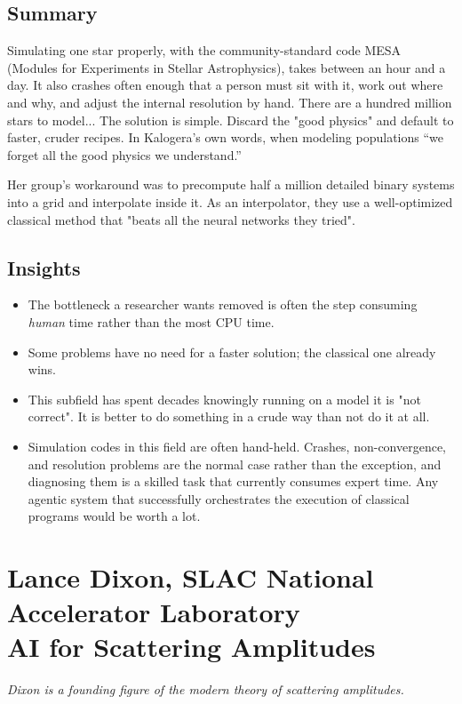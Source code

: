 \documentclass[11pt]{article}
\begin{document}
\subsection*{Summary}
Simulating one star properly, with the community-standard code MESA (Modules for Experiments in Stellar Astrophysics), takes between an hour and a day. It also crashes often enough that a person must sit with it, work out where and why, and adjust the internal resolution by hand. There are a hundred million stars to model... The solution is simple. Discard the "good physics" and default to faster, cruder recipes. In Kalogera's own words, when modeling populations ``we forget all the good physics we understand.''

Her group's workaround was to precompute half a million detailed binary systems into a grid and interpolate inside it. As an interpolator, they use a well-optimized classical method that "beats all the neural networks they tried".

\subsection*{Insights}
\begin{itemize}
    \item The bottleneck a researcher wants removed is often the step consuming \emph{human} time rather than the most CPU time. \item Some problems have no need for a faster solution; the classical one already wins.
    \item This subfield has spent decades knowingly running on a model it is "not correct". It is better to do something in a crude way than not do it at all.
    \item Simulation codes in this field are often hand-held. Crashes, non-convergence, and resolution problems are the normal case rather than the exception, and diagnosing them is a skilled task that currently consumes expert time. Any agentic system that successfully orchestrates the execution of classical programs would be worth a lot.
\end{itemize}

\section{Lance Dixon, SLAC National Accelerator Laboratory\\ {\large AI for Scattering Amplitudes}}

\emph{Dixon is a founding figure of the modern theory of scattering amplitudes.}
\end{document}
